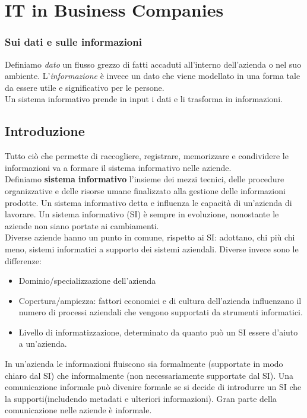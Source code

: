 \chapter{IT in Business Companies}
\subsection{Sui dati e sulle informazioni}
Definiamo \textit{dato} un flusso grezzo di fatti accaduti all'interno dell'azienda o nel suo ambiente.
L'\textit{informazione} \`e invece un dato che viene modellato in una forma tale da essere utile e significativo per le persone.\\
Un sistema informativo prende in input i dati e li trasforma in informazioni.

\section{Introduzione}
Tutto ci\`o che permette di raccogliere, registrare, memorizzare e condividere le informazioni va a formare il sistema informativo nelle aziende.\\
Definiamo \textbf{sistema informativo} l'insieme dei mezzi tecnici, delle procedure organizzative e delle risorse umane finalizzato alla gestione delle informazioni prodotte.
Un sistema informativo detta e influenza le capacit\`a di un'azienda di lavorare.
Un sistema informativo (SI) \`e sempre in evoluzione, nonostante le aziende non siano portate ai cambiamenti.\\


Diverse aziende hanno un punto in comune, rispetto ai SI: adottano, chi pi\`u chi meno, sistemi informatici a supporto dei sistemi aziendali.
Diverse invece sono le differenze:
\begin{itemize}
\item Dominio/specializzazione dell'azienda
\item Copertura/ampiezza: fattori economici e di cultura dell'azienda influenzano il numero di processi aziendali che vengono supportati da strumenti informatici.
\item Livello di informatizzazione, determinato da quanto pu\`o un SI essere d'aiuto a un'azienda.
\end{itemize}

In un'azienda le informazioni fluiscono sia formalmente (supportate in modo chiaro dal SI) che informalmente (non necessariamente supportate dal SI). Una comunicazione informale pu\`o divenire formale se si decide di introdurre un SI che la supporti(includendo metadati e ulteriori informazioni). Gran parte della comunicazione nelle aziende \`e informale.

